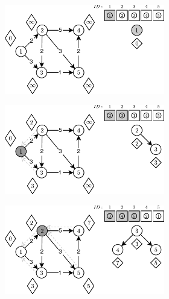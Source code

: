 \begin{figure}[!htbp]
	\centering
	\begin{subfigure}[b]{\textwidth}
		\null\hfill
		\begin{subfigure}[b]{0.325\textwidth}
			\includegraphics[width=\textwidth]{Chapter_II/R-HEAP-Example/a.pdf}
			\caption{}
			\label{fig:exampleDHeap:a}
		\end{subfigure}
		\hfill
		\begin{subfigure}[b]{0.325\textwidth}
			\includegraphics[width=\textwidth]{Chapter_II/R-HEAP-Example/b.pdf}
			\caption{}
			\label{fig:exampleDHeap:b}
		\end{subfigure}
		\hfill
		\begin{subfigure}[b]{0.325\textwidth}
			\includegraphics[width=\textwidth]{Chapter_II/R-HEAP-Example/c.pdf}

\end{subfigure}
\end{subfigure}
\end{figure}
